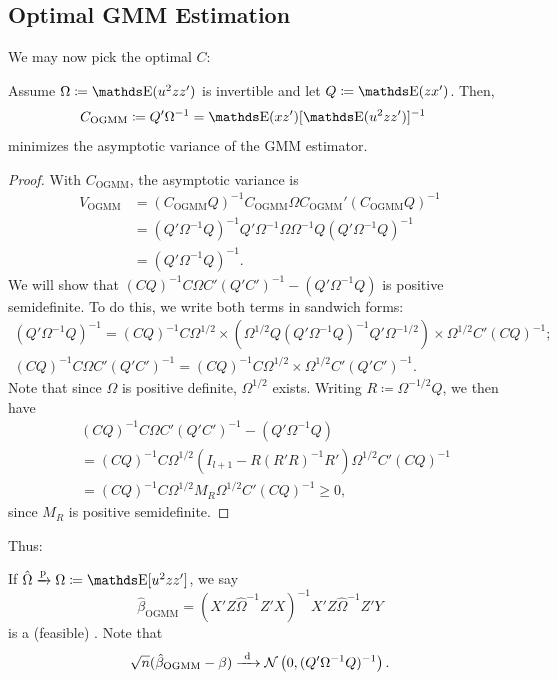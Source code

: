 \documentclass[letterpaper, 10pt]{article}
\DeclareMathOperator{\OGMM}{OGMM}
\begin{document}
\subsection{Optimal GMM Estimation}
We may now pick the optimal \(C\):
\begin{proposition}
  Assume \(\Omega \coloneqq \E(u^2 zz')\) is invertible and let \(Q \coloneqq \E(zx')\).
  Then,
  \begin{align*}
    C_{\OGMM}
    &\coloneqq Q' \Omega^{-1} = \E(xz') [\E(u^2 zz')]^{-1}
  \end{align*}
  minimizes the asymptotic variance of the GMM estimator.
\end{proposition}
\begin{proof}
  With \(C_{\OGMM}\), the asymptotic variance is
  \begin{align*}
    V_{\OGMM}
    &= (C_{\OGMM} Q)^{-1} C_{\OGMM} \Omega C_{\OGMM}' (C_{\OGMM} Q)^{-1} \\
    &= (Q' \Omega^{-1} Q)^{-1} Q' \Omega^{-1} \Omega \Omega^{-1} Q (Q' \Omega^{-1} Q)^{-1} \\
    &= (Q' \Omega^{-1} Q)^{-1}.
  \end{align*}
  We will show that \((CQ)^{-1} C \Omega C' (Q'C')^{-1} - (Q' \Omega^{-1} Q)\) is positive semidefinite.
  To do this, we write both terms in sandwich forms:
  \begin{align*}
    (Q' \Omega^{-1} Q)^{-1}
    = (CQ)^{-1} C \Omega^{1 / 2}
    \times \left( \Omega^{1 / 2} Q (Q' \Omega^{-1} Q)^{-1} Q' \Omega^{- 1 / 2} \right)
    \times \Omega^{1 / 2} C' (CQ)^{-1}; \\
    (CQ)^{-1} C \Omega C' (Q'C')^{-1}
    = (CQ)^{-1} C \Omega^{1 / 2} \times \Omega^{1 / 2} C' (Q' C')^{-1}.
  \end{align*}
  Note that since \(\Omega\) is positive definite, \(\Omega^{1 / 2}\) exists.
  Writing \(R \coloneqq \Omega^{- 1 / 2} Q\), we then have
  \begin{align*}
    &(CQ)^{-1} C \Omega C' (Q'C')^{-1} - (Q' \Omega^{-1} Q) \\
    &= (CQ)^{-1} C \Omega^{1 / 2} \left( I_{l + 1} - R (R'R)^{-1} R' \right) \Omega^{1 / 2} C' (CQ)^{-1} \\
    &= (CQ)^{-1} C \Omega^{1 / 2} M_R \Omega^{1 / 2} C' (CQ)^{-1} \geq 0,
  \end{align*}
  since \(M_R\) is positive semidefinite.
\end{proof}

Thus:
\begin{proposition}
  If \(\hat{\Omega} \probto \Omega \coloneqq \E[u^2 zz']\), we say
  \[
    \hat{\beta}_{\OGMM}
    = (X' Z \hat{\Omega}^{-1} Z' X)^{-1} X' Z \hat{\Omega}^{-1} Z' Y
  \]
  is a (feasible) .
  Note that
  \[
    \sqrt{n} (\hat{\beta}_{\OGMM} - \beta)
    \longdistto \Normal\left( 0, (Q' \Omega^{-1} Q)^{-1} \right).
  \]
\end{proposition}
\end{document}
